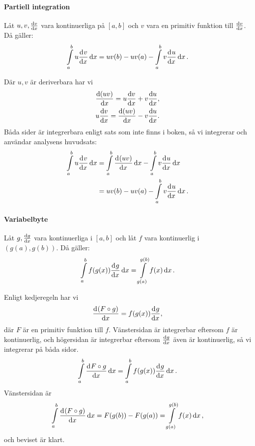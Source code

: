 \paragraph{Partiell integration}
Låt $u, v, \dv{v}{x}$ vara kontinuerliga på $[a, b]$ och $v$ vara en primitiv funktion till $\dv{v}{x}$. Då gäller:
\begin{align*}
	\int\limits_{a}^{b}u\dv[]{v}{x} (x)\dd{x} = uv(b) - uv(a) - \int\limits_{a}^{b}v\dv[]{u}{x} (x)\dd{x}.
\end{align*}

\proof
Där $u, v$ är deriverbara har vi
\begin{align*}
	\dv{(uv)}{x} = u\dv{v}{x} + v\dv{u}{x}, \\
	u\dv{v}{x} = \dv{(uv)}{x} - v\dv{u}{x}.
\end{align*}
Båda sider är integrerbara enligt sats som inte finns i boken, så vi integrerar och användar analysens huvudsats:
\begin{align*}
	\int\limits_{a}^{b}u\dv[]{v}{x} (x)\dd{x} &= \int\limits_{a}^{b}\dv[]{(uv)}{x} (x)\dd{x} - \int\limits_{a}^{b}v\dv[]{u}{x} (x)\dd{x} \\
	                                  &= uv(b) - uv(a) - \int\limits_{a}^{b}v\dv[]{u}{x} (x)\dd{x}.
\end{align*}

\paragraph{Variabelbyte}
Låt $g, \dv{g}{x}$ vara kontinuerliga i $[a, b]$ och låt $f$ vara kontinuerlig i $(g(a), g(b))$. Då gäller:
\begin{align*}
	\int\limits_{a}^{b}f(g(x))\dv[]{g}{x} (x)\dd{x} = \int\limits_{g(a)}^{g(b)}f(x)\dd{x}.
\end{align*}

\proof
Enligt kedjeregeln har vi
\begin{align*}
	\dv[]{(F\circ g)}{x} (x) = f(g(x))\dv[]{g}{x} (x),
\end{align*}
där $F$ är en primitiv funktion till $f$. Vänstersidan är integrerbar eftersom $f$ är kontinuerlig, och högersidan är integrerbar eftersom $\dv{g}{x}$ även är kontinuerlig, så vi integrerar på båda sidor.
\begin{align*}
	\int\limits_{a}^{b}\dv[]{F\circ g}{x} (x)\dd{x} = \int\limits_{a}^{b}f(g(x))\dv[]{g}{x} (x)\dd{x}.
\end{align*}
Vänstersidan är
\begin{align*}
	\int\limits_{a}^{b}\dv[]{(F\circ g)}{x} (x)\dd{x} = F(g(b)) - F(g(a)) = \int\limits_{g(a)}^{g(b)}f(x)\dd{x},
\end{align*}
och beviset är klart.

